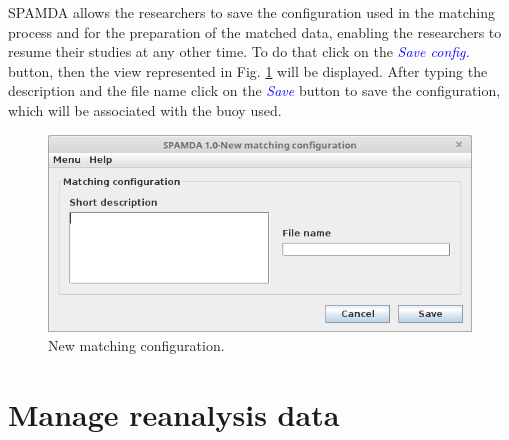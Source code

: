 \begin{onehalfspace}
				
				SPAMDA allows the researchers to save the configuration used in the matching process and for the preparation of the matched data, enabling the researchers to resume their studies at any other time. To do that click on the \textcolor{blue}{\textit{Save config.}} button, then the view represented in Fig. \ref{fig:creatingMatchingConfiguration} will be displayed. After typing the description and the file name click on the \textcolor{blue}{\textit{Save}} button to save the configuration, which will be associated with the buoy used.
				
				\begin{figure}[ht!]
					\centering
					\includegraphics[scale=0.40]{figures/creatingMatchingConfiguration.png}
					\caption{New matching configuration.}
					\label{fig:creatingMatchingConfiguration}
				\end{figure}

		\section{Manage reanalysis data}
		

\end{onehalfspace}
